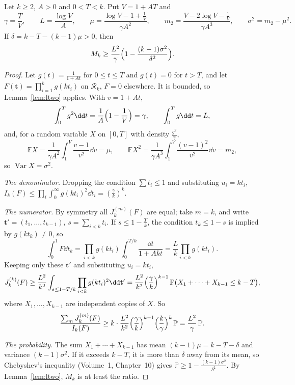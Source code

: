 \begin{lemma}\label{lem:productF}
Let $k\ge2$, $A>0$ and $0<T<k$. Put $V=1+AT$ and
\[
\gamma=\frac TV,\qquad L=\frac{\log V}A,\qquad\mu=\frac{\log V-1+\frac1V}{\gamma A^2},\qquad m_2=\frac{V-2\log V-\frac1V}{\gamma A^3},\qquad\sigma^2=m_2-\mu^2.
\]
If $\delta=k-T-(k-1)\mu>0$, then
\[
M_k\ge\frac{L^2}\gamma\Bigl(1-\frac{(k-1)\sigma^2}{\delta^2}\Bigr).
\]
\end{lemma}
\begin{proof}
Let $g(t)=\frac1{1+At}$ for $0\le t\le T$ and $g(t)=0$ for $t>T$, and let $F(\mathbf t)=\prod_{i=1}^kg(kt_i)$ on $\mathcal R_k$, $F=0$ elsewhere. It is bounded, so Lemma~\ref{lem:ltwo} applies. With $v=1+At$,
\[
\int_0^Tg^2\dd t=\frac1A\Bigl(1-\frac1V\Bigr)=\gamma,\qquad\int_0^Tg\dd t=L,
\]
and, for a random variable $X$ on $[0,T]$ with density $\frac{g^2}\gamma$,
\[
\mathbb EX=\frac1{\gamma A^2}\int_1^V\frac{v-1}{v^2}\dd v=\mu,\qquad\mathbb EX^2=\frac1{\gamma A^3}\int_1^V\frac{(v-1)^2}{v^2}\dd v=m_2,
\]
so $\operatorname{Var}X=\sigma^2$.

\emph{The denominator.} Dropping the condition $\sum t_i\le1$ and substituting $u_i=kt_i$, $I_k(F)\le\prod_i\int_0^\infty g(kt_i)^2\dd t_i=(\frac\gamma k)^k$.

\emph{The numerator.} By symmetry all $J_k^{(m)}(F)$ are equal; take $m=k$, and write $\mathbf t'=(t_1,\dots,t_{k-1})$, $s=\sum_{i<k}t_i$. If $s\le1-\frac Tk$, the condition $t_k\le1-s$ is implied by $g(kt_k)\ne0$, so
\[
\int_0^1F\dd t_k=\prod_{i<k}g(kt_i)\int_0^{T/k}\frac{\dd t}{1+Akt}=\frac Lk\prod_{i<k}g(kt_i).
\]
Keeping only these $\mathbf t'$ and substituting $u_i=kt_i$,
\[
J_k^{(k)}(F)\ge\frac{L^2}{k^2}\int_{s\le1-T/k}\prod_{i<k}g(kt_i)^2\dd\mathbf t'=\frac{L^2}{k^2}\Bigl(\frac\gamma k\Bigr)^{k-1}\,\mathbb P\bigl(X_1+\cdots+X_{k-1}\le k-T\bigr),
\]
where $X_1,\dots,X_{k-1}$ are independent copies of $X$. So
\[
\frac{\sum_mJ_k^{(m)}(F)}{I_k(F)}\ge k\cdot\frac{L^2}{k^2}\Bigl(\frac\gamma k\Bigr)^{k-1}\Bigl(\frac k\gamma\Bigr)^k\,\mathbb P=\frac{L^2}\gamma\,\mathbb P.
\]

\emph{The probability.} The sum $X_1+\cdots+X_{k-1}$ has mean $(k-1)\mu=k-T-\delta$ and variance $(k-1)\sigma^2$. If it exceeds $k-T$, it is more than $\delta$ away from its mean, so Chebyshev's inequality (Volume~1, Chapter~10) gives $\mathbb P\ge1-\frac{(k-1)\sigma^2}{\delta^2}$. By Lemma~\ref{lem:ltwo}, $M_k$ is at least the ratio.
\end{proof}

